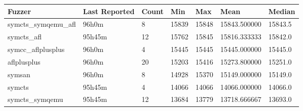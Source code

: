 
\begin{table*}[h]
\centering
\begin{tabular}{|l|l|l|l|l|l|l|}
\hline
\textbf{Fuzzer} & \textbf{Last Reported} & \textbf{Count} & \textbf{Min} & \textbf{Max} & \textbf{Mean} & \textbf{Median} \\
\hline
symcts\_symqemu\_afl & 96h0m              & 8      & 15839 & 15848 & 15843.500000  & 15843.5    \\
symcts\_afl        & 95h45m             & 12     & 15762 & 15845 & 15816.333333  & 15842.0    \\
symcc\_aflplusplus & 96h0m              & 4      & 15445 & 15445 & 15445.000000  & 15445.0    \\
aflplusplus        & 96h0m              & 20     & 15203 & 15416 & 15273.800000  & 15251.0    \\
symsan             & 96h0m              & 8      & 14928 & 15370 & 15149.000000  & 15149.0    \\
symcts             & 95h45m             & 4      & 14066 & 14066 & 14066.000000  & 14066.0    \\
symcts\_symqemu    & 95h45m             & 12     & 13684 & 13779 & 13718.666667  & 13693.0    \\
\hline
\end{tabular}
\end{table*}